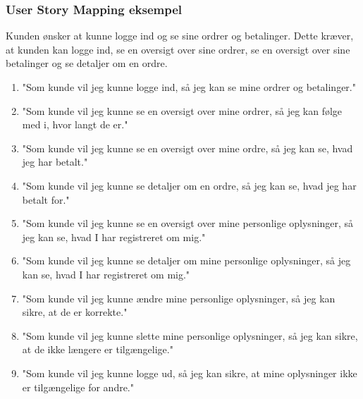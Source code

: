 \subsubsection{User Story Mapping eksempel}
Kunden ønsker at kunne logge ind og se sine ordrer og betalinger. Dette kræver, at kunden kan logge ind, se en oversigt over sine ordrer, se en oversigt over sine betalinger og se detaljer om en ordre.
\begin{enumerate}
    \item "Som kunde vil jeg kunne logge ind, så jeg kan se mine ordrer og betalinger."
    \item "Som kunde vil jeg kunne se en oversigt over mine ordrer, så jeg kan følge med i, hvor langt de er."
    \item "Som kunde vil jeg kunne se en oversigt over mine ordre, så jeg kan se, hvad jeg har betalt."
    \item "Som kunde vil jeg kunne se detaljer om en ordre, så jeg kan se, hvad jeg har betalt for."
    \item "Som kunde vil jeg kunne se en oversigt over mine personlige oplysninger, så jeg kan se, hvad I har registreret om mig."
    \item "Som kunde vil jeg kunne se detaljer om mine personlige oplysninger, så jeg kan se, hvad I har registreret om mig."
    \item "Som kunde vil jeg kunne ændre mine personlige oplysninger, så jeg kan sikre, at de er korrekte."
    \item "Som kunde vil jeg kunne slette mine personlige oplysninger, så jeg kan sikre, at de ikke længere er tilgængelige."
    \item "Som kunde vil jeg kunne logge ud, så jeg kan sikre, at mine oplysninger ikke er tilgængelige for andre."
    \label{item:user-story-mapping-eksempel}
\end{enumerate}

